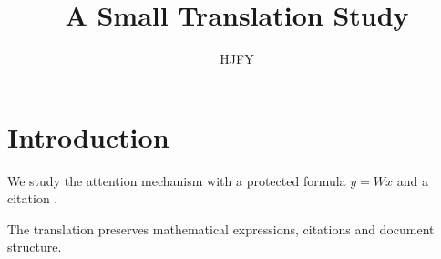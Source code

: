 \documentclass{article}
\title{A Small Translation Study}
\author{HJFY}
\date{}
\begin{document}
\maketitle
\section{Introduction}
We study the attention mechanism with a protected formula $y=Wx$ and a citation \cite{sample}.

The translation preserves mathematical expressions, citations and document structure.



\end{document}
